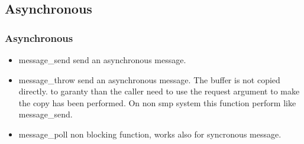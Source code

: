 \subsection{Asynchronous}
\begin{frame}
\frametitle{Asynchronous}
\begin{itemize}
\item message\_send send an asynchronous message.
\item message\_throw send an asynchronous message. The buffer is not
copied directly. to garanty than the caller need to use the request
argument to make the copy has been performed. On non smp system this
function perform like message\_send.
\item message\_poll non blocking function, works also for syncronous
message.
\end{itemize}
\end{frame}


